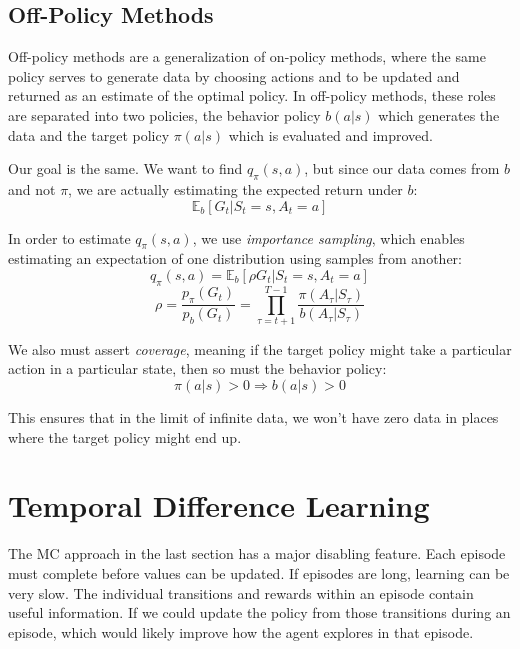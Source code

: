 \documentclass{article}
\begin{document}
\subsection{Off-Policy Methods}
Off-policy methods are a generalization of on-policy methods, where the same policy serves to generate data by choosing actions and to 
be updated and returned as an estimate of the optimal policy. In off-policy methods, these roles are separated into two policies, the behavior
policy $b(a|s)$ which generates the data and the target policy $\pi(a|s)$ which is evaluated and improved.

Our goal is the same. We want to find $q_\pi(s,a)$, but since our data comes from $b$ and not $\pi$, we are actually estimating the expected 
return under $b$:
\begin{equation*}
  \mathbb{E}_b[G_t | S_t = s, A_t = a]
\end{equation*}

In order to estimate $q_\pi(s,a)$, we use \emph{importance sampling}, which enables estimating an expectation of one distribution using samples from another:
\begin{equation}
  q_\pi(s,a) = \mathbb{E}_b[\rho G_t|S_t=s,A_t=a]
\end{equation}
\begin{equation}
  \rho = \frac{p_\pi(G_t)}{p_b(G_t)} = \prod_{\tau=t+1}^{T-1} \frac{\pi(A_\tau|S_\tau)}{b(A_\tau|S_\tau)}
\end{equation}

We also must assert \emph{coverage}, meaning if the target policy might take a particular action in a particular state, then so must the behavior policy:
\begin{equation}
  \pi(a|s) > 0 \Rightarrow b(a|s) > 0
\end{equation}

This ensures that in the limit of infinite data, we won't have zero data in places where the target policy might end up.



\section{Temporal Difference Learning}
The MC approach in the last section has a major disabling feature. Each episode must complete before values can be updated. 
If episodes are long, learning can be very slow. The individual transitions and rewards within an episode contain useful information.
If we could update the policy from those transitions during an episode, which would likely improve how the agent explores in that episode.
\end{document}
